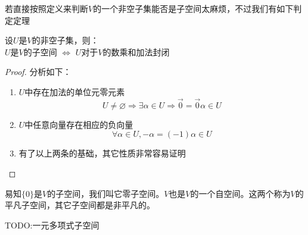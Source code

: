 若直接按照定义来判断$V$的一个非空子集能否是子空间太麻烦，不过我们有如下判定定理
\begin{theorem}[子空间判定定理]
    设$U$是$V$的非空子集，则：\\
    $U$是$V$的子空间 $\Leftrightarrow$ $U$对于$V$的数乘和加法封闭
\end{theorem}
\begin{proof}
    分析如下：
    \begin{enumerate}
        \item $U$中存在加法的单位元零元素
        \begin{equation*}
            U \neq \varnothing \Rightarrow \exists \alpha \in U \Rightarrow \vec{0} = \vec{0}\alpha \in U
        \end{equation*}
        
        \item $U$中任意向量存在相应的负向量
        \begin{equation*}
            \forall \alpha \in U, -\alpha = (-1)\alpha \in U
        \end{equation*}

        \item 有了以上两条的基础，其它性质非常容易证明
    \end{enumerate}
\end{proof}

易知$\{ 0 \}$是$V$的子空间，我们叫它零子空间。$V$也是$V$的一个自空间。这两个称为$V$的平凡子空间，其它子空间都是非平凡的。

\begin{example}
    TODO:一元多项式子空间
\end{example}

